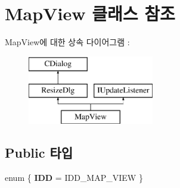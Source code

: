 \hypertarget{class_map_view}{}\section{Map\+View 클래스 참조}
\label{class_map_view}
Map\+View에 대한 상속 다이어그램 \+: \begin{figure}[H]
\begin{center}
\leavevmode
\includegraphics[height=3.000000cm]{class_map_view}
\end{center}
\end{figure}
\subsection*{Public 타입}
\begin{DoxyCompactItemize}
\item 
\mbox{\label{class_map_view_ad398582947c2a9b34e2217a782349299}} 
enum \{ {\bfseries I\+DD} = I\+D\+D\+\_\+\+M\+A\+P\+\_\+\+V\+I\+EW
 \}
\end{DoxyCompactItemize}
